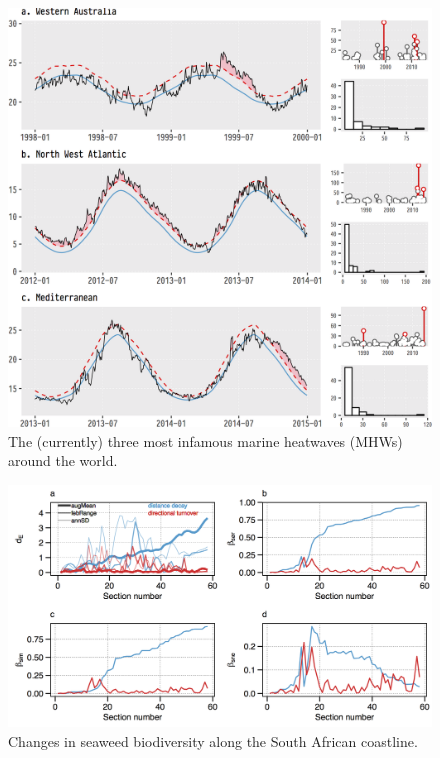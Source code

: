 \documentclass[]{book}
\theoremstyle{definition}
\theoremstyle{definition}
\theoremstyle{definition}
\theoremstyle{remark}
\begin{document}
\begin{figure}

{\centering \includegraphics[width=1\linewidth]{figures/deeper-infamous-event-plots-1} 

}

\caption{The (currently) three most infamous marine heatwaves (MHWs) around the world.}\label{fig:example2}
\end{figure}

\begin{figure}

{\centering \includegraphics[width=1\linewidth]{figures/Ecography_figure5a-d} 

}

\caption{Changes in seaweed biodiversity along the South African coastline.}\label{fig:example4}
\end{figure}
\end{document}
